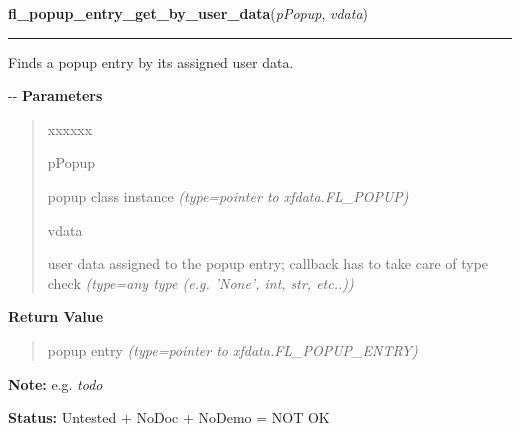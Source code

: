     \label{xformslib:flpopup:fl_popup_entry_get_by_user_data}

    \vspace{0.5ex}

\hspace{.8\funcindent}\begin{boxedminipage}{\funcwidth}

    \raggedright \textbf{fl\_popup\_entry\_get\_by\_user\_data}(\textit{pPopup}, \textit{vdata})

    \vspace{-1.5ex}

    \rule{\textwidth}{0.5\fboxrule}
\setlength{\parskip}{2ex}

Finds a popup entry by its assigned user data.

-{}-
\setlength{\parskip}{1ex}
      \textbf{Parameters}
      \vspace{-1ex}

      \begin{quote}
        \begin{Ventry}{xxxxxx}

          \item[pPopup]


popup class instance
            {\it (type=pointer to xfdata.FL\_POPUP)}

          \item[vdata]


user data assigned to the popup entry; callback has to take care of
type check
            {\it (type=any type (e.g. 'None', int, str, etc..))}

        \end{Ventry}

      \end{quote}

      \textbf{Return Value}
    \vspace{-1ex}

      \begin{quote}

popup entry
      {\it (type=pointer to xfdata.FL\_POPUP\_ENTRY)}

      \end{quote}

\textbf{Note:} 
e.g. \emph{todo}


\textbf{Status:} 
Untested + NoDoc + NoDemo = NOT OK


    \end{boxedminipage}

